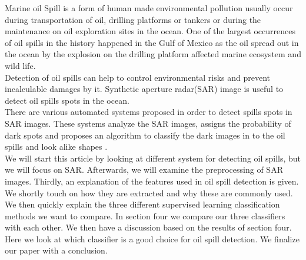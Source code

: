 Marine oil Spill is a form of human made environmental pollution usually occur during transportation of oil, drilling platforms or tankers \cite{Zhang201476}or during the maintenance on oil exploration sites in the ocean. One of the largest occurrences of oil spills in the history happened in the Gulf of Mexico as the oil spread out in the ocean by the explosion on the drilling platform affected marine ecosystem and wild life\cite{Bozeman2011244}.\\
Detection of oil spills can help to control environmental risks and prevent incalculable damages by it. Synthetic aperture radar(SAR) image is useful to detect oil spills spots in the ocean. \\
There are various automated systems proposed in order to detect spills spots in SAR images. These systems analyze the SAR images, assigns the probability of dark spots and proposes an algorithm to classify the dark images in to the oil spills and look alike shapes \cite{Xu201414,brekke2008classifiers,Keramitsoglou2006640,Guo2014146}.\\
We will start this article by looking at different system for detecting oil spills, but we will focus on SAR. Afterwards, we will examine the preprocessing of SAR images. Thirdly, an explanation of the features used in oil spill detection is given. We shortly touch on how they are extracted and why these are commonly used. We then quickly explain the three different supervised learning classification methods we want to compare. In section four we compare our three classifiers with each other. We then have a discussion based on the results of section four. Here we look at which classifier is a good choice for oil spill detection. We finalize our paper with a conclusion.